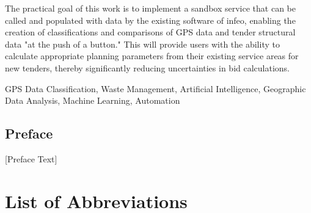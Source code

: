 \documentclass[a4paper,12pt,twoside]{scrreprt}
\begin{document}
The practical goal of this work is to implement a sandbox service that can be called and populated with data by the existing software of infeo, enabling the creation of classifications and comparisons of GPS data and tender structural data "at the push of a button." This will provide users with the ability to calculate appropriate planning parameters from their existing service areas for new tenders, thereby significantly reducing uncertainties in bid calculations.
\vspace{0.5cm}

\noindent
GPS Data Classification, Waste Management, Artificial Intelligence, Geographic Data Analysis, Machine Learning, Automation

\newpage
\section*{Preface}   %

[Preface Text]


\cleardoublepage   %
\tableofcontents

\clearpage
{}
{}
\listoffigures

\clearpage
{}
{}
\listoftables

\clearpage
{}
{}  %
\chapter*{List of Abbreviations} %
\begin{acronym}[SQL]
\end{acronym}

\end{document}
